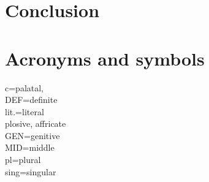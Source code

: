 \documentclass[11pt,a4paper]{article}
\begin{document}
	
	\section{Conclusion}
	
	\newpage
	
	
	
	\newpage
	\section*{Acronyms and symbols}
	c=palatal,\\
	DEF=definite\\
	lit.=literal\\
	plosive, affricate\\
	GEN=genitive\\
	MID=middle\\
	pl=plural\\
	sing=singular\\
	
\end{document}
